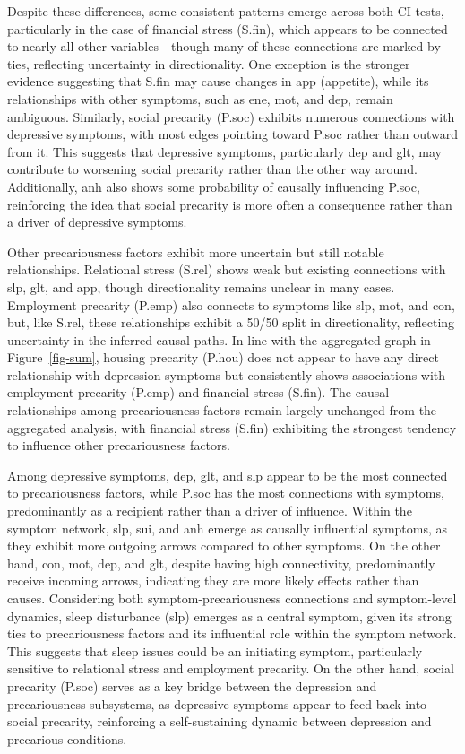 \documentclass[
]{article}
\begin{document}
Despite these differences, some consistent patterns emerge across both
CI tests, particularly in the case of financial stress (S.fin), which
appears to be connected to nearly all other variables---though many of
these connections are marked by ties, reflecting uncertainty in
directionality. One exception is the stronger evidence suggesting that
S.fin may cause changes in app (appetite), while its relationships with
other symptoms, such as ene, mot, and dep, remain ambiguous. Similarly,
social precarity (P.soc) exhibits numerous connections with depressive
symptoms, with most edges pointing toward P.soc rather than outward from
it. This suggests that depressive symptoms, particularly dep and glt,
may contribute to worsening social precarity rather than the other way
around. Additionally, anh also shows some probability of causally
influencing P.soc, reinforcing the idea that social precarity is more
often a consequence rather than a driver of depressive symptoms.

Other precariousness factors exhibit more uncertain but still notable
relationships. Relational stress (S.rel) shows weak but existing
connections with slp, glt, and app, though directionality remains
unclear in many cases. Employment precarity (P.emp) also connects to
symptoms like slp, mot, and con, but, like S.rel, these relationships
exhibit a 50/50 split in directionality, reflecting uncertainty in the
inferred causal paths. In line with the aggregated graph in
Figure~\ref{fig-sum}, housing precarity (P.hou) does not appear to have
any direct relationship with depression symptoms but consistently shows
associations with employment precarity (P.emp) and financial stress
(S.fin). The causal relationships among precariousness factors remain
largely unchanged from the aggregated analysis, with financial stress
(S.fin) exhibiting the strongest tendency to influence other
precariousness factors.

Among depressive symptoms, dep, glt, and slp appear to be the most
connected to precariousness factors, while P.soc has the most
connections with symptoms, predominantly as a recipient rather than a
driver of influence. Within the symptom network, slp, sui, and anh
emerge as causally influential symptoms, as they exhibit more outgoing
arrows compared to other symptoms. On the other hand, con, mot, dep, and
glt, despite having high connectivity, predominantly receive incoming
arrows, indicating they are more likely effects rather than causes.
Considering both symptom-precariousness connections and symptom-level
dynamics, sleep disturbance (slp) emerges as a central symptom, given
its strong ties to precariousness factors and its influential role
within the symptom network. This suggests that sleep issues could be an
initiating symptom, particularly sensitive to relational stress and
employment precarity. On the other hand, social precarity (P.soc) serves
as a key bridge between the depression and precariousness subsystems, as
depressive symptoms appear to feed back into social precarity,
reinforcing a self-sustaining dynamic between depression and precarious
conditions.
\end{document}
